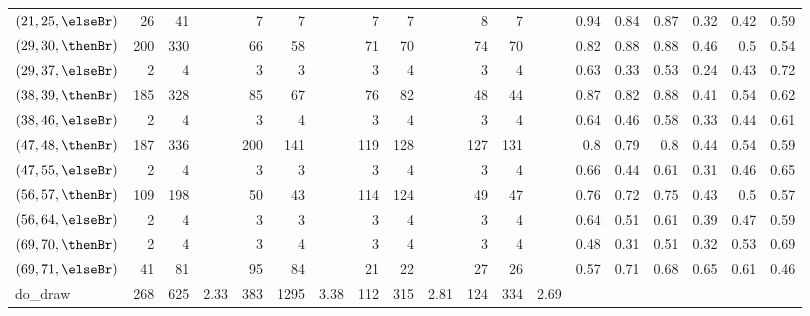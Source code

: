 \begin{table}
\begin{tabular}{l|rrr|rrr|rrr|rrr|rrrrrr}
    $(21,25,\elseBr)$  & 26   & 41   &                   & 7    & 7   &                    & 7     & 7   &                     & 8   & 7   & & 0.94 & 0.84 & 0.87 & 0.32 & 0.42 & 0.59 \\
    $(29,30,\thenBr)$  & 200  & 330  &                   & 66   & 58  &                    & 71    & 70  &                     & 74  & 70  & & 0.82 & 0.88 & 0.88 & 0.46 & 0.5  & 0.54 \\
    $(29,37,\elseBr)$  & 2    & 4    &                   & 3    & 3   &                    & 3     & 4   &                     & 3   & 4   & & 0.63 & 0.33  & 0.53 & 0.24 & 0.43 & 0.72 \\
    $(38,39,\thenBr)$  & 185  & 328  &                   & 85   & 67  &                    & 76    & 82  &                     & 48  & 44  & & 0.87 & 0.82 & 0.88 & 0.41 & 0.54 & 0.62 \\
    $(38,46,\elseBr)$  & 2    & 4    &                   & 3    & 4   &                    & 3     & 4   &                     & 3   & 4   & & 0.64 & 0.46 & 0.58 & 0.33 & 0.44 & 0.61 \\
    $(47,48,\thenBr)$  & 187  & 336  &                   & 200  & 141 &                    & 119   & 128 &                     & 127 & 131 & & 0.8  & 0.79 & 0.8  & 0.44  & 0.54 & 0.59 \\
    $(47,55,\elseBr)$  & 2    & 4    &                   & 3    & 3   &                    & 3     & 4   &                     & 3   & 4   & & 0.66 & 0.44 & 0.61 & 0.31 & 0.46 & 0.65 \\
    $(56,57,\thenBr)$  & 109  & 198  &                   & 50   & 43  &                    & 114   & 124 &                     & 49  & 47  & & 0.76 & 0.72 & 0.75 & 0.43 & 0.5  & 0.57 \\
    $(56,64,\elseBr)$  & 2    & 4    &                   & 3    & 3   &                    & 3     & 4   &                     & 3   & 4   & & 0.64 & 0.51 & 0.61 & 0.39 & 0.47 & 0.59 \\
    $(69,70,\thenBr)$  & 2    & 4    &                   & 3    & 4   &                    & 3     & 4   &                     & 3   & 4   & & 0.48 & 0.31 & 0.51 & 0.32 & 0.53 & 0.69 \\
    $(69,71,\elseBr)$  & 41   & 81   &                   & 95   & 84  &                    & 21    & 22  &                     & 27  & 26  & & 0.57 & 0.71 & 0.68 & 0.65  & 0.61 & 0.46 \\
    \midrule
    \midrule
    do\_draw           & 268  & 625   & 2.33             & 383 & 1295 & 3.38               & 112 & 315 & 2.81                  & 124 & 334 & 2.69 &        &             &   &     &             & \\

\end{tabular}
\end{table}
